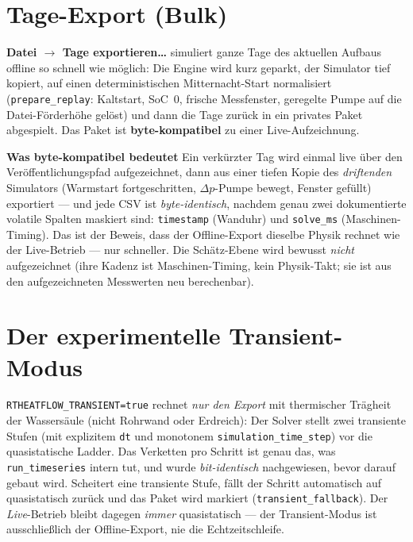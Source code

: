 \documentclass[11pt,a4paper,parskip=half]{scrreprt}
\newcommand{\ui}[1]{\textsf{\bfseries #1}}
\newcommand{\api}[1]{\texttt{#1}}
\newenvironment{beispiel}[1][Beispiel]
  {\par\medskip{\color{bsp}\hrule height 0.8pt}\nopagebreak\smallskip
   \noindent\textbf{\textsf{\textcolor{bsp}{#1}}}\quad\ignorespaces}
  {\par\nopagebreak\smallskip{\color{bsp}\hrule height 0.8pt}\par\medskip}
\begin{document}
\section{Tage-Export (Bulk)}

\ui{Datei $\rightarrow$ Tage exportieren…} simuliert ganze Tage des aktuellen
Aufbaus offline so schnell wie möglich: Die Engine wird kurz geparkt, der
Simulator tief kopiert, auf einen deterministischen Mitternacht-Start
normalisiert (\texttt{prepare\_replay}: Kaltstart, SoC~0, frische
Messfenster, geregelte Pumpe auf die Datei-Förderhöhe gelöst) und dann die Tage
zurück in ein privates Paket abgespielt. Das Paket ist \textbf{byte-kompatibel}
zu einer Live-Aufzeichnung.

\begin{beispiel}[Was \glqq byte-kompatibel\grqq{} bedeutet]
Ein verkürzter Tag wird einmal live über den Veröffentlichungspfad
aufgezeichnet, dann aus einer tiefen Kopie des \emph{driftenden} Simulators
(Warmstart fortgeschritten, $\Delta p$-Pumpe bewegt, Fenster gefüllt) exportiert
--- und jede CSV ist \emph{byte-identisch}, nachdem genau zwei dokumentierte
volatile Spalten maskiert sind: \texttt{timestamp} (Wanduhr) und
\texttt{solve\_ms} (Maschinen-Timing). Das ist der Beweis, dass der Offline-Export
dieselbe Physik rechnet wie der Live-Betrieb --- nur schneller. Die
Schätz-Ebene wird bewusst \emph{nicht} aufgezeichnet (ihre Kadenz ist
Maschinen-Timing, kein Physik-Takt; sie ist aus den aufgezeichneten Messwerten
neu berechenbar).
\end{beispiel}

\section{Der experimentelle Transient-Modus}
\label{sec:transient}

\api{RTHEATFLOW\_TRANSIENT=true} rechnet \emph{nur den Export} mit thermischer
Trägheit der Wassersäule (nicht Rohrwand oder Erdreich): Der Solver stellt zwei
transiente Stufen (mit explizitem \texttt{dt} und monotonem
\texttt{simulation\_time\_step}) vor die quasistatische Ladder. Das Verketten
pro Schritt ist genau das, was \texttt{run\_timeseries} intern tut, und wurde
\emph{bit-identisch} nachgewiesen, bevor darauf gebaut wird. Scheitert eine
transiente Stufe, fällt der Schritt automatisch auf quasistatisch zurück und das
Paket wird markiert (\texttt{transient\_fallback}). Der \emph{Live}-Betrieb
bleibt dagegen \emph{immer} quasistatisch --- der Transient-Modus ist
ausschließlich der Offline-Export, nie die Echtzeitschleife.
\end{document}
